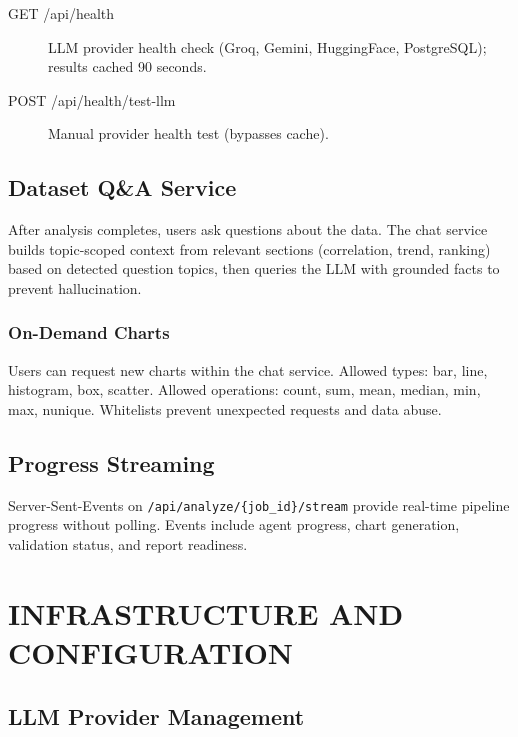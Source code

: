 \documentclass[12pt,a4paper,openany]{report}
\begin{document}
\begin{description}
	\item[GET /api/health] LLM provider health check (Groq, Gemini, HuggingFace, PostgreSQL); results cached 90 seconds.
	\item[POST /api/health/test-llm] Manual provider health test (bypasses cache).
\end{description}

\section{Dataset Q\&A Service}

After analysis completes, users ask questions about the data. The chat service builds topic-scoped context from relevant sections (correlation, trend, ranking) based on detected question topics, then queries the LLM with grounded facts to prevent hallucination.

\subsection{On-Demand Charts}

Users can request new charts within the chat service. Allowed types: bar, line, histogram, box, scatter. Allowed operations: count, sum, mean, median, min, max, nunique. Whitelists prevent unexpected requests and data abuse.

\section{Progress Streaming}

Server-Sent-Events on \texttt{/api/analyze/\{job\_id\}/stream} provide real-time pipeline progress without polling. Events include agent progress, chart generation, validation status, and report readiness.

\chapter{INFRASTRUCTURE AND CONFIGURATION}
\label{ch:infrastructure}

\section{LLM Provider Management}
\end{document}
